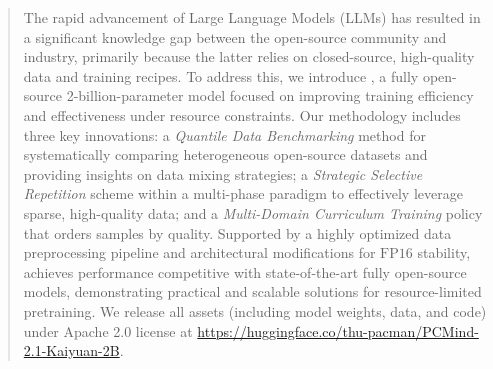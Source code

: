 \begin{abstract}

The rapid advancement of Large Language Models (LLMs) has resulted in a significant knowledge gap between the open-source community and industry, primarily because the latter relies on closed-source, high-quality data and training recipes. To address this, we introduce \textbf{\fullsys}, a fully open-source 2-billion-parameter model focused on improving training efficiency and effectiveness under resource constraints. Our methodology includes three key innovations: a \emph{Quantile Data Benchmarking} method for systematically comparing heterogeneous open-source datasets and providing insights on data mixing strategies; a \emph{Strategic Selective Repetition} scheme within a multi-phase paradigm to effectively leverage sparse, high-quality data; and a \emph{Multi-Domain Curriculum Training} policy that orders samples by quality. Supported by a highly optimized data preprocessing pipeline and architectural modifications for $\text{FP}16$ stability, \sys achieves performance competitive with state-of-the-art fully open-source models, demonstrating practical and scalable solutions for resource-limited pretraining. We release all assets (including model weights, data, and code) under Apache 2.0 license at \url{https://huggingface.co/thu-pacman/PCMind-2.1-Kaiyuan-2B}. 







\end{abstract}
